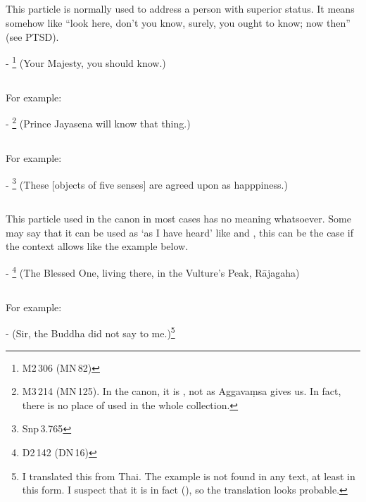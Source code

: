 \subsection*{}\label{nip:yagghe}
This particle is normally used to address a person with superior status. It means somehow like ``look here, don't you know, surely, you ought to know; now then'' (see PTSD).\par
- \footnote{M2\,306 (MN\,82)} (Your Majesty, you should know.) \par

\subsection*{}\label{nip:vatha}
For example:\par
- \footnote{M3\,214 (MN\,125). In the canon, it is , not  as Aggava\d msa gives us. In fact, there is no place of  used in the whole collection.} (Prince Jayasena will know that thing.) \par

\subsection*{}\label{nip:vo}
For example:\par
- \footnote{Snp\,3.765} (These [objects of five senses] are agreed upon as happpiness.) \par

\subsection*{}\label{nip:sudadm}
This particle used in the canon in most cases has no meaning whatsoever. Some may say that it can be used as `as I have heard' like  and , this can be the case if the context allows like the example below.\par
- \footnote{D2\,142 (DN\,16)} (The Blessed One, living there, in the Vulture's Peak, R\=ajagaha) \par

\subsection*{}\label{nip:ha}
For example:\par
-  (Sir, the Buddha did not say to me.)\footnote{I translated this from Thai. The example is not found in any text, at least in this form. I suspect that it is in fact  (), so the translation looks probable.} \par

